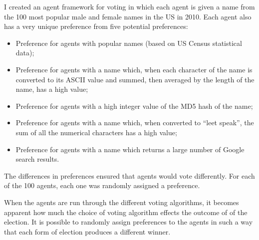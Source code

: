 \documentclass{article}
\begin{document}
I created an agent framework for voting in which each agent is given a name from the 100 most popular male and female names in the US in 2010. Each agent also has a very unique preference from five potential preferences:

\begin{itemize}
    \item{Preference for agents with popular names (based on US Census statistical data);}
    \item{Preference for agents with a name which, when each character of the name is converted to its ASCII value and summed, then averaged by the length of the name, has a high value;}
    \item{Preference for agents with a high integer value of the MD5 hash of the name;}
    \item{Preference for agents with a name which, when converted to ``leet speak'', the sum of all the numerical characters has a high value;}
    \item{Preference for agents with a name which returns a large number of Google search results.}
\end{itemize}

The differences in preferences ensured that agents would vote differently. For each of the 100 agents, each one was randomly assigned a preference.

When the agents are run through the different voting algorithms, it becomes apparent how much the choice of voting algorithm effects the outcome of of the election. It is possible to randomly assign preferences to the agents in such a way that each form of election produces a different winner.
\end{document}
